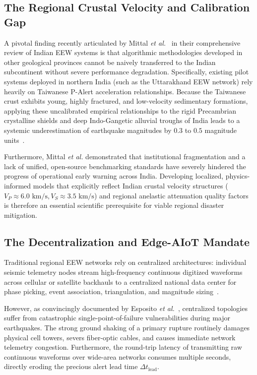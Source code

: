 \documentclass[journal]{IEEEtran}
\begin{document}
\subsection{The Regional Crustal Velocity and Calibration Gap}
A pivotal finding recently articulated by Mittal \textit{et al.}~\cite{mittal2025india} in their comprehensive review of Indian EEW systems is that algorithmic methodologies developed in other geological provinces cannot be naively transferred to the Indian subcontinent without severe performance degradation. Specifically, existing pilot systems deployed in northern India (such as the Uttarakhand EEW network) rely heavily on Taiwanese P-Alert acceleration relationships. Because the Taiwanese crust exhibits young, highly fractured, and low-velocity sedimentary formations, applying these uncalibrated empirical relationships to the rigid Precambrian crystalline shields and deep Indo-Gangetic alluvial troughs of India leads to a systemic underestimation of earthquake magnitudes by $0.3$ to $0.5$ magnitude units~\cite{mittal2025india}.

Furthermore, Mittal \textit{et al.} demonstrated that institutional fragmentation and a lack of unified, open-source benchmarking standards have severely hindered the progress of operational early warning across India. Developing localized, physics-informed models that explicitly reflect Indian crustal velocity structures ($V_P \approx 6.0\text{ km/s}, V_S \approx 3.5\text{ km/s}$) and regional anelastic attenuation quality factors is therefore an essential scientific prerequisite for viable regional disaster mitigation.

\subsection{The Decentralization and Edge-AIoT Mandate}
Traditional regional EEW networks rely on centralized architectures: individual seismic telemetry nodes stream high-frequency continuous digitized waveforms across cellular or satellite backhauls to a centralized national data center for phase picking, event association, triangulation, and magnitude sizing~\cite{allen2019earthquake}. 

However, as convincingly documented by Esposito \textit{et al.}~\cite{esposito2025aiot}, centralized topologies suffer from catastrophic single-point-of-failure vulnerabilities during major earthquakes. The strong ground shaking of a primary rupture routinely damages physical cell towers, severs fiber-optic cables, and causes immediate network telemetry congestion. Furthermore, the round-trip latency of transmitting raw continuous waveforms over wide-area networks consumes multiple seconds, directly eroding the precious alert lead time $\Delta t_{\text{lead}}$.
\end{document}
